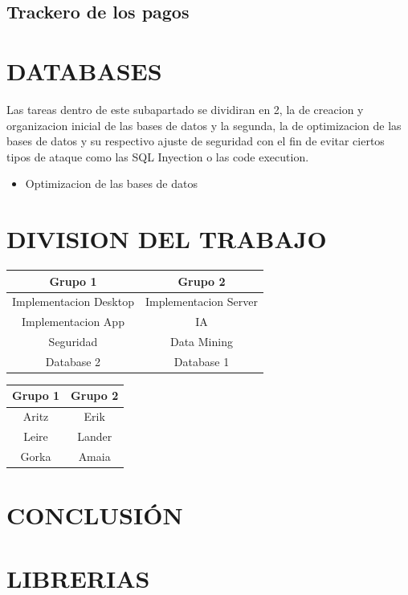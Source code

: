 \documentclass{article}
\theoremstyle{definition}
\begin{document}
\subsection{Trackero de los pagos}

\section{DATABASES}


Las tareas dentro de este subapartado se dividiran en 2, la de creacion y organizacion inicial de las bases de datos y la segunda, la de optimizacion de las bases de datos y su respectivo ajuste de seguridad con el fin de evitar ciertos tipos de ataque como las SQL Inyection o las code execution.


\begin{itemize}
    \item Optimizacion de las bases de datos
\end{itemize}

\section{DIVISION DEL TRABAJO}


\begin{tabular}{|c|c|}
    \hline Grupo 1 & Grupo 2 \\
    \hline Implementacion Desktop & Implementacion Server \\
    Implementacion App & IA \\
    Seguridad & Data Mining \\
    Database 2 & Database 1 \\
    \hline
\end{tabular}

\begin{tabular}{|c|c|}
    \hline
    Grupo 1  & Grupo 2 \\
    \hline
    Aritz & Erik \\
    Leire & Lander \\
    Gorka & Amaia \\
    \hline
\end{tabular}




\section{CONCLUSIÓN}


\section{LIBRERIAS}
\end{document}
